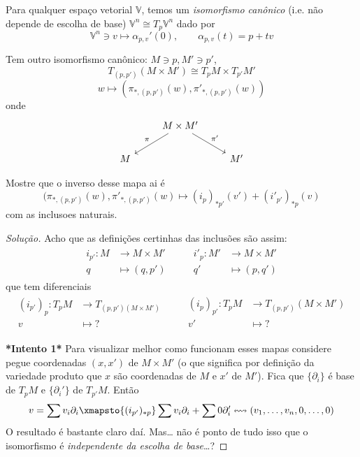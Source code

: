 \begin{remark}\leavevmode
Para qualquer espaço vetorial \(\mathbb{V}\), temos um \textit{isomorfismo canônico} (i.e. não depende de escolha de base) \(\mathbb{V}^n \cong T_p\mathbb{V}^n\) dado por
\[\mathbb{V}^n \ni v \longmapsto \alpha_{p,v}'(0),\qquad  \alpha_{p,v}(t)=p+tv\]

Tem outro isomorfismo canônico: \(M\ni p,M' \ni p'\),
\[T_{(p,p')}(M \times M') \cong T_pM \times T_{p'}M'\]
\[w \longmapsto(\pi_{*,(p,p')}(w),\pi'_{*,(p,p')}(w))\]
onde
\[\begin{tikzcd}
&M\times M'\arrow[dl,"\pi",swap]\arrow[dr,"\pi'"]\\
M&&M'
\end{tikzcd}\]
\begin{exercise}\leavevmode
Mostre que o inverso desse mapa ai é
\[(\pi_{*,(p,p')}(w),\pi'_{*,(p,p')}(w) \longmapsto(i_p)_{* p'}(v') + (i'_{p'})_{* p}(v)\]
com as inclusoes naturais.
\end{exercise}
\begin{proof}[Solução]\leavevmode
 Acho que as definições certinhas das inclusões são assim:
\begin{align*}
\begin{aligned}
i_{p'}: M &\longrightarrow M \times M' \\
q &\longmapsto (q,p')
\end{aligned}\qquad
\begin{aligned}
i'_p: M' &\longrightarrow M \times M' \\
	q' &\longmapsto (p,q')
\end{aligned}
\end{align*}
que tem diferenciais
\begin{align*}
\begin{aligned}
	(i_{p'})_p: T_pM &\longrightarrow T_{(p,p')(M\times M')} \\
	v &\longmapsto ?
\end{aligned}\qquad
\begin{aligned}
	(i_p)_{p'}: T_pM &\longrightarrow T_{(p,p')}(M\times M') \\
	 v'&\longmapsto ?
\end{aligned}
\end{align*}

\textbf{*Intento 1*} Para visualizar melhor como funcionam esses mapas considere pegue coordenadas \((x,x')\) de \(M \times M'\) (o que significa por definição da variedade produto que \(x\) são coordenadas de \(M\) e \(x'\) de \(M'\)). Fica que \( \{\partial_i\}\) é base de \(T_pM\) e \(\{\partial_i'\}\) de \(T_{p'}M\). Então
\[v=\sum v_i\partial_i\xmapsto{(i_{p'})_{*p}} \sum v_i\partial_i+\sum 0\partial_i' \leftrightsquigarrow(v_1,\ldots,v_n,0,\ldots,0)\]
O resultado é bastante claro daí. Mas… não é ponto de tudo isso que o isomorfismo é \textit{independente da escolha de base}…?


\end{proof}
\end{remark}
